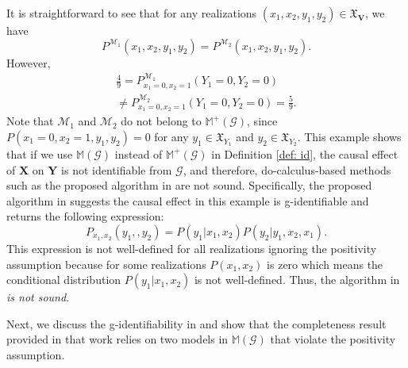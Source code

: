 \documentclass[accepted]{uai2022}
\newcommand{\V}[0]{\mathbf{V}}
\newcommand{\G}[0]{\mathcal{G}}
\newcommand{\M}[0]{\mathcal{M}}
\newcommand{\dom}[1]{\mathfrak{X}_{#1}}
\begin{document}
        It is straightforward to see that for any realizations $(x_1,x_2,y_1,y_2) \in \dom{\V}$, we have
        \begin{equation*}
            P^{\M_1}(x_1,x_2,y_1,y_2) = P^{\M_2}(x_1,x_2,y_1,y_2).
        \end{equation*}
        However,
        \begin{equation*}
        \begin{split}
            \frac{4}{9}=P^{\M_1}_{x_1=0, x_2=1}(Y_1=0, Y_2=0) \\
            \neq 
            P^{\M_2}_{x_1=0, x_2=1}(Y_1=0, Y_2=0) = \frac{5}{9}.
        \end{split}
        \end{equation*}
        Note that $\M_1$ and $\M_2$ do not belong to $\mathbb{M}^+(\G)$, since $P(x_1=0, x_2=1, y_1, y_2)= 0$ for any $y_1\in \dom{Y_1}$ and $y_2\in \dom{Y_2}$.
        This example shows that if we use $\mathbb{M}(\G)$ instead of $\mathbb{M}^+(\G)$ in Definition \ref{def: id}, the causal effect of $\mathbf{X}$ on $\mathbf{Y}$ is not identifiable from $\G$, and therefore, do-calculus-based methods such as the proposed algorithm in \cite{lee2019general} are not sound.
        Specifically, the proposed algorithm in \cite{lee2019general} suggests the causal effect in this example is g-identifiable and returns the following expression:
        \begin{equation*}
            P_{x_1, x_2}(y_1,, y_2) = P(y_1|x_1, x_2)P(y_2|y_1, x_2, x_1).
        \end{equation*}
        This expression is not well-defined for all realizations ignoring the positivity assumption because for some realizations $P(x_1, x_2)$ is zero which means the conditional distribution $P(y_1|x_1, x_2)$ is not well-defined.
        Thus, the algorithm in \cite{lee2019general} \textit{is not sound}.
        
    
        Next, we discuss the g-identifiability in \cite{lee2019general} and show that the completeness result provided in that work relies on two models in $\mathbb{M}(\G)$ that violate the positivity assumption.
    
\end{document}
